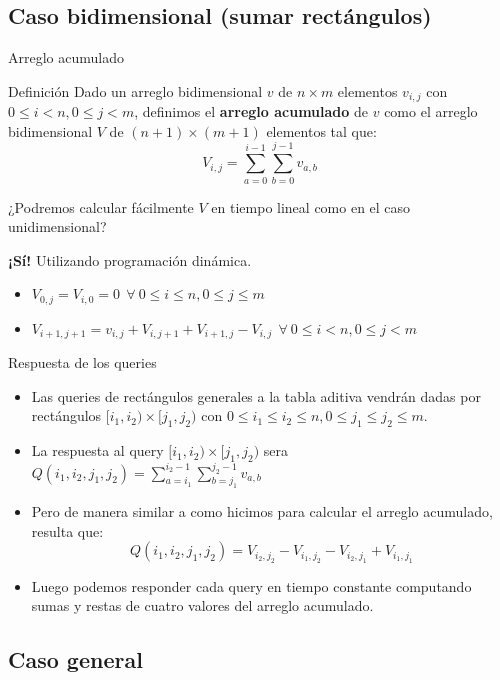 \documentclass{beamer}
\begin{document}
\subsection{Caso bidimensional (sumar rectángulos)}

\begin{frame}{Arreglo acumulado}
   \begin{block}{Definición}
      Dado un arreglo bidimensional $v$ de $n \times m$ elementos $v_{i,j}$ con $0 \leq i < n, 0\leq j < m$, 
      definimos el \textbf{arreglo acumulado} de $v$ como el arreglo bidimensional $V$ de $(n+1) \times (m+1)$ elementos
      tal que:
      $$V_{i,j} = \sum_{a=0}^{i-1}\sum_{b=0}^{j-1}{v_{a,b}}$$
  \end{block}
  ¿Podremos calcular fácilmente $V$ en tiempo lineal como en el caso unidimensional?
  {
      \textbf{¡Sí!} Utilizando programación dinámica.
      \begin{itemize}
        \item $V_{0,j} = V_{i,0} = 0 \ \ \forall \ 0 \leq i \leq n, 0 \leq j \leq m$
        \item $V_{i+1,j+1} = v_{i,j} + V_{i,j+1} + V_{i+1,j} - V_{i,j} \ \ \forall \ 0 \leq i < n, 0 \leq j < m$
      \end{itemize}
  }
\end{frame}

\begin{frame}{Respuesta de los queries}
  \begin{itemize}
  \item Las queries de rectángulos generales a la tabla aditiva vendrán dadas por rectángulos $[i_1,i_2) \times [j_1,j_2)$ con $0 \leq i_1 \leq i_2 \leq n, 0 \leq j_1 \leq j_2 \leq m$.
  \item La respuesta al query $[i_1,i_2) \times [j_1,j_2)$ sera $Q(i_1,i_2,j_1,j_2) = \sum \limits _{a=i_1}^{i_2-1}\sum \limits _{b=j_1}^{j_2-1}{v_{a,b}}$
    \item Pero de manera similar a como hicimos para calcular el arreglo acumulado, resulta que:
    $$Q(i_1,i_2,j_1,j_2) = V_{i_2,j_2} - V_{i_1,j_2} - V_{i_2,j_1} + V_{i_1,j_1}$$
    \item Luego podemos responder cada query en tiempo constante computando sumas y restas de cuatro valores del arreglo acumulado.
  \end{itemize}
\end{frame}

\subsection{Caso general}
\end{document}
